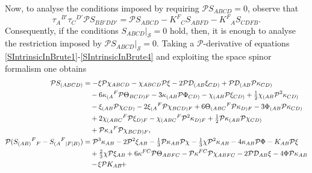 \documentclass[10pt,a4paper]{article}
\theoremstyle{plain}
\begin{document}
Now, to analyse the conditions imposed by requiring
$\mathcal{P}S_{ABCD}=0$, observe that
\begin{equation}
\tau_{A}{}^{B'}\tau_{C}{}^{D'}\mathcal{P}S_{BB'DD'}=\mathcal{P}S_{ABCD}-K^{F}{}_{C}S_{ABFD}-K^{F}{}_{A}S_{CDFB}.
\end{equation}
 Consequently, if the conditions $S_{ABCD}|_{\mathcal{S}}=0$ hold,
 then, it is enough to analyse the restriction imposed by
 $\mathcal{P}S_{ABCD}|_{\mathcal{S}}=0$. Taking a
 $\mathcal{P}$-derivative of equations
 \eqref{SIntrinsicInBrute1}-\eqref{SIntrinsicInBrute4} and exploiting
 the space spinor formalism one obtains
\begin{subequations}
\begin{align}
\mathcal{P}S_{(ABCD)} &=-\xi\mathcal{P}\chi_{ABCD} -
\chi_{ABCD}\mathcal{P}\xi-2\mathcal{P}\mathcal{D}_{(AB}\xi_{CD)}
+\mathcal{P}\mathcal{D}_{(AB}\mathcal{P}\kappa_{CD)} \nonumber \\ &
\quad -6\kappa_{(A}{}^{F}\mathcal{P}\Theta_{BCD)F}
-3\kappa_{(AB}\mathcal{P}\Phi_{CD)}-\chi_{(AB}\mathcal{P}\xi_{CD)} +
\tfrac{1}{2}\chi_{(AB}\mathcal{P}^{2}\kappa_{CD)} \nonumber \\ & \quad
-\xi_{(AB}\mathcal{P}\chi_{CD)}
-2\xi_{(A}{}^{F}\mathcal{P}\chi_{BCD)F}
+6\Theta_{(ABC}{}^{F}\mathcal{P}\kappa_{D)F}
-3\Phi_{(AB}\mathcal{P}\kappa_{CD)} \nonumber \\ & \quad
+2\chi_{(ABC}{}^{F}\mathcal{P}\xi_{D)F}-\chi_{(ABC}{}^{F}\mathcal{P}^{2}\kappa_{D)F}
+ \tfrac{1}{2}\mathcal{P}\kappa_{(AB}\mathcal{P}\chi_{CD)} \nonumber
\\ & \quad
+\mathcal{P}\kappa_{A}{}^{F}\mathcal{P}\chi_{BCD)F}, \label{PSIntrinsicInBrute1}
\\
 \mathcal{P}(S_{(AB)}{}^{F}{}_{F} - S_{(A}{}^{F}{}_{|F|B)}) &=
 \mathcal{P}^{3}\kappa_{AB}-2\mathcal{P}^{2}\xi_{AB}
 -\tfrac{1}{3}\mathcal{P}\kappa_{AB}\mathcal{P}\chi -\tfrac{1}{3}\chi
 \mathcal{P}^2\kappa_{AB} -4\kappa_{AB}\mathcal{P}\Phi
 -K_{AB}\mathcal{P}\xi \nonumber \\ & \quad
 +\tfrac{2}{3}\chi\mathcal{P}\xi_{AB}+6\kappa^{FC}\mathcal{P}\Theta_{ABFC}
 -\mathcal{P}\kappa^{FC}\mathcal{P}\chi_{ABFC}-2\mathcal{P}\mathcal{D}_{AB}\xi
 -4\Phi\mathcal{P}\kappa_{AB} \nonumber \\ & \quad
 -\hspace{-0.5mm}\xi\mathcal{P}K_{AB}\hspace{-0.5mm}+\hspace{-0.5mm}

\end{align}
\end{subequations}
\end{document}
